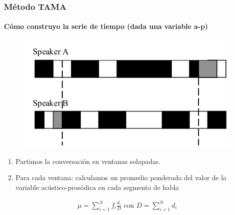 \begin{frame}
  \frametitle{Método TAMA}
  \framesubtitle{Cómo construyo la serie de tiempo (dada una variable a-p)}
  \begin{figure}[t]
    \includegraphics[scale=0.25]{images/tama.png}
  \end{figure}


  \begin{enumerate}
    \item Partimos la conversación en ventanas solapadas.
    \item Para cada ventana: calculamos un promedio ponderado del valor de la variable acústico-prosódica en cada segmento de habla
  \end{enumerate}

  \begin{align*}
    \mu = \sum\limits_{i=1}^N f_i \frac{d_i}{D} \text{ con } D = \sum\limits_{i=1}^N d_i
  \end{align*}
\end{frame}


